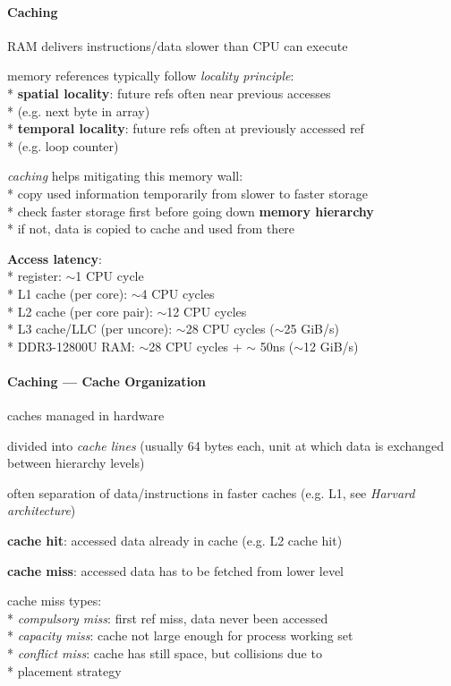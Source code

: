 \paragraph{Caching}
\begin{items}
	\item RAM delivers instructions/data slower than CPU can execute
	\item memory references typically follow \emph{locality principle}: \\*
		\textbf{spatial locality}: future refs often near previous accesses \\*
			\phantom{x} (e.g. next byte in array) \\*
		\textbf{temporal locality}: future refs often at previously accessed ref \\*
			\phantom{x} (e.g. loop counter)
	\item \emph{caching} helps mitigating this memory wall: \\*
		copy used information temporarily from slower to faster storage \\*
		check faster storage first before going down \textbf{memory hierarchy} \\*
		if not, data is copied to cache and used from there
	\item \textbf{Access latency}: \\*
		register: \( \sim \)1 CPU cycle \\*
		L1 cache (per core): \( \sim \)4 CPU cycles \\*
		L2 cache (per core pair): \( \sim \)12 CPU cycles \\*
		L3 cache/LLC (per uncore): \( \sim \)28 CPU cycles (\( \sim \)25 GiB/s) \\*
		DDR3-12800U RAM: \( \sim \)28 CPU cycles + \( \sim \) 50ns (\( \sim \)12 GiB/s)
\end{items}

\paragraph{Caching --- Cache Organization}
\begin{items}
	\item caches managed in hardware
	\item divided into \emph{cache lines} (usually 64 bytes each, unit at which data is exchanged between hierarchy levels)
	\item often separation of data/instructions in faster caches (e.g. L1, see \emph{Harvard architecture})
	\item \textbf{cache hit}: accessed data already in cache (e.g. L2 cache hit)
	\item \textbf{cache miss}: accessed data has to be fetched from lower level
	\item cache miss types: \\*
		\emph{compulsory miss}: first ref miss, data never been accessed \\*
		\emph{capacity miss}: cache not large enough for process working set \\*
		\emph{conflict miss}: cache has still space, but collisions due to \\* \phantom{x} placement strategy
\end{items}

